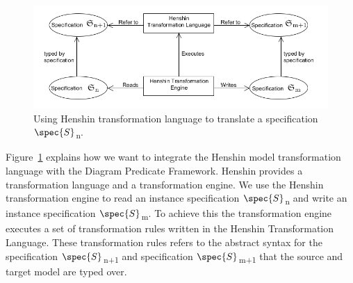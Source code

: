 \begin{figure}[H]
	\centering
	\includegraphics[scale=0.7]{./Figures/TransformationSolutionBasic.png}
	\caption[Integrating Henshin with DPF]
	{Using Henshin transformation language to translate a specification
	$\spec{S}$\textsubscript{n}.}
	\label{fig:Simple_Solution}
\end{figure}

Figure~\ref{fig:Simple_Solution} explains how we want to integrate the Henshin
model transformation language with the Diagram Predicate Framework. Henshin
provides a transformation language and a transformation engine. We
use the Henshin transformation engine to read an instance specification
$\spec{S}$\textsubscript{n} and write an instance specification
$\spec{S}$\textsubscript{m}. To achieve this the transformation engine executes
a set of transformation rules written in the Henshin Transformation Language.
These transformation rules refers to the abstract syntax for the
specification $\spec{S}$\textsubscript{n+1} and specification
$\spec{S}$\textsubscript{m+1} that the source and target model are typed over.

